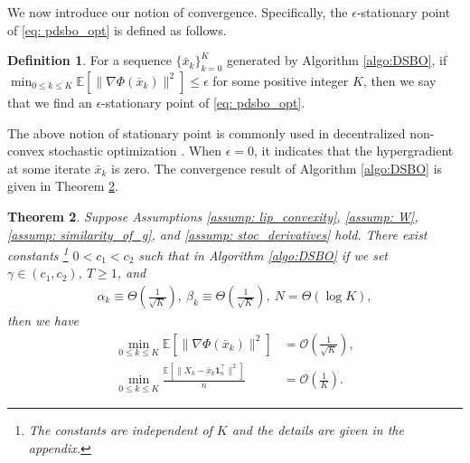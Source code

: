 \documentclass{article}
\theoremstyle{plain}
\newtheorem{theorem}{Theorem}[section]
\theoremstyle{definition}
\newtheorem{defi}[theorem]{Definition}
\theoremstyle{remark}
\newcommand{\E}{\mathbb{E}}
\newcommand{\cO}{\mathcal{O}}
\newcommand{\bfonet}{\mathbf{1}^{\top}}
\begin{document}
We now introduce our notion of convergence. Specifically, the $\epsilon$-stationary point of \eqref{eq: pdsbo_opt} is defined as follows. 
\begin{defi}
    For a sequence $\{\bar x_k\}_{k=0}^{K}$ generated by Algorithm \ref{algo:DSBO}, if  $\min_{0\leq k\leq K} \E\left[\|\nabla\Phi(\bar{x}_k)\|^2\right]\leq \epsilon$ for some positive integer $K$, then we say that we find an $\epsilon$-stationary point of \eqref{eq: pdsbo_opt}.
\end{defi}
The above notion of stationary point is commonly used in decentralized non-convex stochastic optimization \citep{lian2017can}. When $\epsilon=0$, it indicates that the hypergradient at some iterate $\bar{x}_k$ is zero. 
The convergence result of Algorithm \ref{algo:DSBO} is given in Theorem \ref{thm: main}.

\begin{theorem}\label{thm: main}
Suppose Assumptions \ref{assump: lip_convexity}, \ref{assump: W}, \ref{assump: similarity_of_g}, and \ref{assump: stoc_derivatives} hold. There exist constants \footnote{The constants are independent of $K$ and the details are given in the appendix.} $0<c_1<c_2$ such that in Algorithm \ref{algo:DSBO} if we set $\gamma\in (c_1, c_2)$, $T\geq 1$, and
    \begin{align*}
        \alpha_k \equiv \Theta\left(\frac{1}{\sqrt{K}}\right),\ \beta_k \equiv \Theta\left(\frac{1}{\sqrt{K}}\right),\ N = \Theta\left(\log K\right), 
    \end{align*}
    then we have
    \[
        \begin{aligned}
            \min_{0\leq k\leq K}\E\left[\|\nabla\Phi(\bar{x}_k)\|^2\right] &= \cO\left(\frac{1}{\sqrt{K}}\right), \\
            \min_{0\leq k\leq K}\frac{\E\left[\|X_k - \bar{x}_k\bfonet_n\|^2\right]}{n} &= \cO\left(\frac{1}{K}\right).
        \end{aligned}
    \]
\end{theorem}
\end{document}
